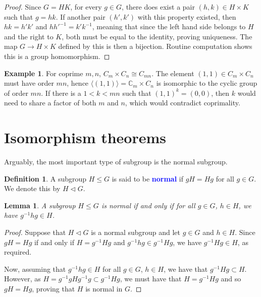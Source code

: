 \documentclass[12pt]{report}
\newcommand{\indx}[1]{\index{#1}\textbf{\textcolor{blue}{#1}}}
\newcommand{\C}{\mathbb{C}}
\newcommand{\iso}{\cong}
\newtheorem{lemma}[theorem]{Lemma}
\theoremstyle{definition}
\newtheorem{definition}[theorem]{Definition}
\newtheorem{example}[theorem]{Example}
\begin{document}
\begin{proof}
  Since \(G = HK\), for every \(g \in G\), there does exist a pair \((h,k) \in H \times K\) such that \(g = hk\). If another pair \((h',k')\) with this property existed, then \(hk = h'k'\) and \(hh'^{-1} = k'k^{-1}\), meaning that since the left hand side belongs to \(H\) and the right to \(K\), both must be equal to the identity, proving uniqueness. The map \(G \to H \times K\) defined by this is then a bijection. Routine computation shows this is a group homomorphism.
\end{proof}

\begin{example}
  For coprime \(m, n\), \(C_{m} \times C_{n} \iso C_{mn}\).
  The element \((1,1) \in C_{m} \times C_{n}\) must have order \(mn\), hence \(\langle (1,1)\rangle= \C_{m} \times C_{n}\) is isomorphic to the cyclic group of order \(mn\).
  If there is a \(1 < k < mn\) such that \((1,1)^{k} = (0,0)\), then \(k\) would need to share a factor of both \(m\) and \(n\), which would contradict coprimality.
\end{example}



\section{Isomorphism theorems}
\label{sec:group-theory:isomorphism-theorems}

Arguably, the most important type of subgroup is the normal subgroup.

\begin{definition}\label{def:group-theory:normal-subgroup}
  A subgroup \(H \leq G\) is said to be \indx{normal} if \(gH = Hg\) for all \(g \in G\).
  We denote this by \(H \triangleleft G\).
\end{definition}

\begin{lemma}
 \label{lem:group-theory:normal-subgroup-criterion}
  A subgroup \(H \leq G\) is normal if and only if for all \(g \in G\), \(h \in H\), we have \(g^{-1}hg \in H\).
\end{lemma}

\begin{proof}
  Suppose that \(H \triangleleft G\) is a normal subgroup and let \(g \in G\) and \(h \in H\).
  Since \(gH = Hg\) if and only if \(H = g^{-1}Hg\) and \(g^{-1}hg \in  g^{-1}Hg\), we have \(g^{-1}Hg \in H\), as required.

  Now, assuming that \(g^{-1}hg \in H\) for all \(g \in G\), \(h \in H\), we have that \(g^{-1} H g \subset H\). However, as \(H = g^{-1}gHg^{-1}g \subset g^{-1}Hg\), we must have that \(H = g^{-1}Hg\) and so \(gH = Hg\), proving that \(H\) is normal in \(G\).
\end{proof}
\end{document}

